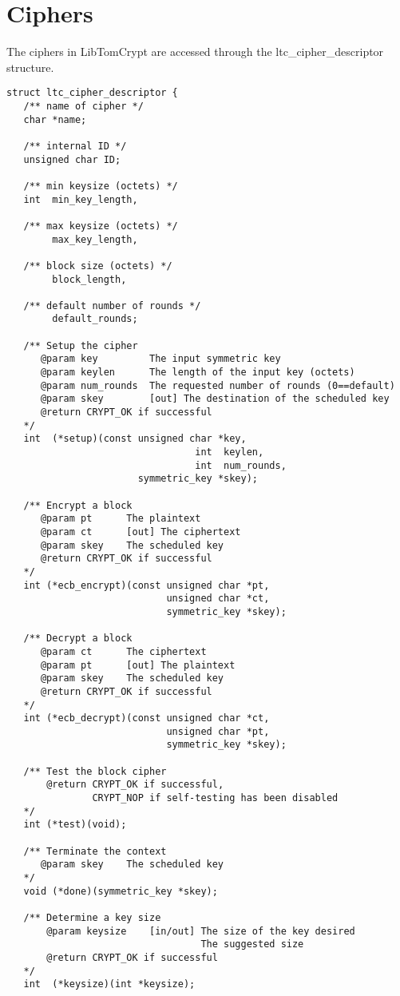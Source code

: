 \documentclass[synpaper]{book}
\newcommand{\mysection}[1]    %
	{                   %
	\section{#1}
   \markboth{\textsf{www.libtom.org}}{\thesection ~ {#1}}
	}
\begin{document}
\mysection{Ciphers}
The ciphers in LibTomCrypt are accessed through the ltc\_cipher\_descriptor structure.

\label{sec:cipherdesc}
\begin{small}
\begin{verbatim}
struct ltc_cipher_descriptor {
   /** name of cipher */
   char *name;

   /** internal ID */
   unsigned char ID;

   /** min keysize (octets) */
   int  min_key_length,

   /** max keysize (octets) */
        max_key_length,

   /** block size (octets) */
        block_length,

   /** default number of rounds */
        default_rounds;

   /** Setup the cipher
      @param key         The input symmetric key
      @param keylen      The length of the input key (octets)
      @param num_rounds  The requested number of rounds (0==default)
      @param skey        [out] The destination of the scheduled key
      @return CRYPT_OK if successful
   */
   int  (*setup)(const unsigned char *key,
                                 int  keylen,
                                 int  num_rounds,
                       symmetric_key *skey);

   /** Encrypt a block
      @param pt      The plaintext
      @param ct      [out] The ciphertext
      @param skey    The scheduled key
      @return CRYPT_OK if successful
   */
   int (*ecb_encrypt)(const unsigned char *pt,
                            unsigned char *ct,
                            symmetric_key *skey);

   /** Decrypt a block
      @param ct      The ciphertext
      @param pt      [out] The plaintext
      @param skey    The scheduled key
      @return CRYPT_OK if successful
   */
   int (*ecb_decrypt)(const unsigned char *ct,
                            unsigned char *pt,
                            symmetric_key *skey);

   /** Test the block cipher
       @return CRYPT_OK if successful,
               CRYPT_NOP if self-testing has been disabled
   */
   int (*test)(void);

   /** Terminate the context
      @param skey    The scheduled key
   */
   void (*done)(symmetric_key *skey);

   /** Determine a key size
       @param keysize    [in/out] The size of the key desired
                                  The suggested size
       @return CRYPT_OK if successful
   */
   int  (*keysize)(int *keysize);


\end{verbatim}
\end{small}
\end{document}
